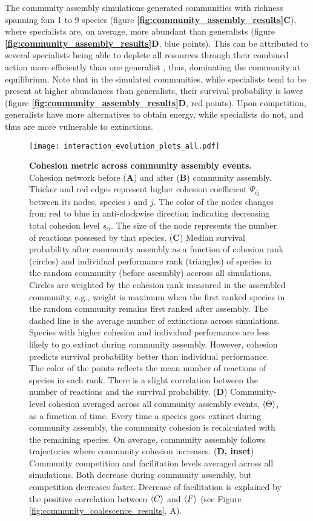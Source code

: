 \documentclass[titlepage,11pt]{article}
\begin{document}
\begin{linenumbers}
\begin{singlespace}
			The community assembly simulations generated communities with richness spanning fom 1 to 9 species (figure \textbf{\ref{fig:community_assembly_results}C}), where specialists are, on average, more abundant than generalists (figure \textbf{\ref{fig:community_assembly_results}D}, blue points). This can be attributed to several specialists being able to deplete all resources through their combined action more efficiently than one generalist \citep{Pascual-Garcia2020}, thus, dominating the community at equilibrium. Note that in the simulated communities, while specialists tend to be present at higher abundances than generalists, their survival probability is lower (figure \textbf{\ref{fig:community_assembly_results}D}, red points). Upon competition, generalists have more alternatives to obtain energy, while specialists do not, and thus are more vulnerable to extinctions.\\
			\begin{figure}
				\centering			
				\texttt{[image: interaction\_evolution\_plots\_all.pdf]}
				\caption{\textbf{Cohesion metric across community assembly events.} Cohesion network before (\textbf{A}) and after (\textbf{B}) community assembly. Thicker and red edges represent higher  cohesion coefficient $ \Psi_{ij} $ between its nodes, species $ i \text{ and } j $. The color of the nodes changes from red to blue in anti-clockwise direction indicating decreasing total cohesion level $ s_{\alpha} $. The size of the node represents the number of reactions possesed by that species. (\textbf{C}) Median survival probability after community assembly as a function of cohesion rank (circles) and individual performance rank (triangles) of species in the random community (before asesmbly) accross all simulations. Circles are weighted by the cohesion rank measured in the assembled community, e.g., weight is maximum when the first ranked species in the random community remains first ranked after assembly. The dashed line is the average number of extinctions across simulations. Species with higher cohesion and individual performance are less likely to go extinct during community assembly. However, cohesion predicts survival probability better than individual performance. The color of the points reflects the mean number of reactions of species in each rank. There is a slight correlation between the number of reactions and the survival probability. (\textbf{D})  Community-level cohesion averaged across all community assembly events,  $\braket{\Theta} $, as a function of time. Every time a species goes extinct during community assembly, the community cohesion is recalculated with the remaining species. On average, community assembly follows trajectories where community cohesion increases. (\textbf{D, inset}) Community competition and facilitation levels averaged across all simulations. Both decrease during community assembly, but competition decreases faster. Decrease of facilitation is explained by the positive correlation between $ \braket{C} $ and $ \braket{F} $ (see Figure \ref{fig:community_coalescence_results}, A).}

\end{figure}
\end{singlespace}
\end{linenumbers}
\end{document}
